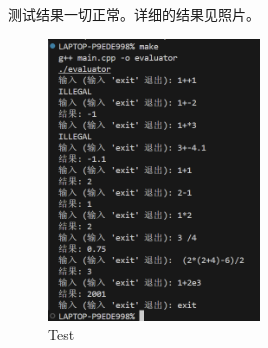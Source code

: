 \documentclass[UTF8]{ctexart}
\begin{document}
测试结果一切正常。详细的结果见照片。\\

\begin{figure}[h]
    \centering
    \includegraphics[width=0.5\textwidth]{./ceshi.png}
    \caption{Test}
    \label{fig:photo}
\end{figure}
\end{document}
